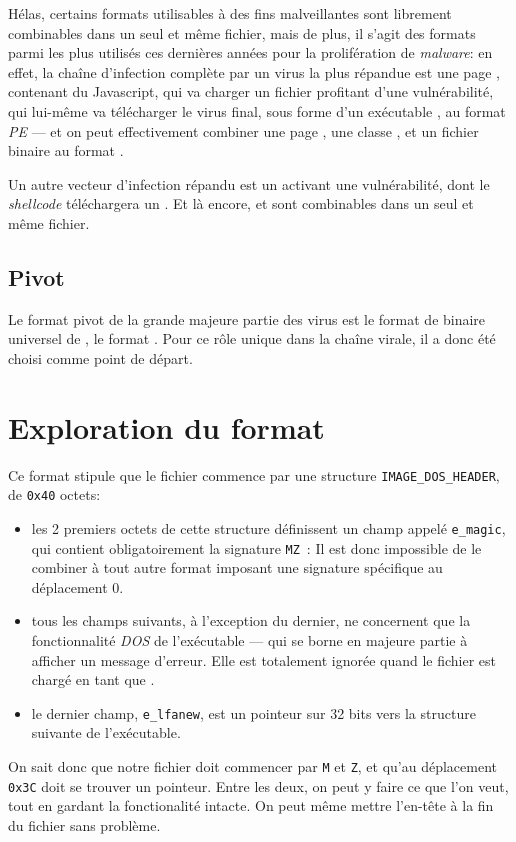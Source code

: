 Hélas, certains formats utilisables à des fins malveillantes sont librement combinables dans un seul et même fichier, mais de plus, il s'agit des formats parmi les plus utilisés ces dernières années pour la prolifération de {\it malware}:
en effet, la chaîne d'infection complète par un virus la plus répandue est une page \HTML, contenant du Javascript, qui va charger un fichier \JAVA profitant d'une vulnérabilité, qui lui-même va télécharger le virus final, sous forme d'un exécutable \WIN, au format \emph{PE} --- et on peut effectivement combiner une page \HTML, une classe \JAVA, et un fichier binaire au format \PE.

Un autre vecteur d'infection répandu est un \PDF activant une vulnérabilité, dont le \emph{shellcode} téléchargera un \PE. Et là encore, \PE et \PDF sont combinables dans un seul et même fichier.

\subsection{Pivot}

Le format pivot de la grande majeure partie des virus est le format de binaire universel de \WIN, le format \PE. Pour ce rôle unique dans la chaîne virale, il a donc été choisi comme point de départ.

\section{Exploration du format \PE}
Ce format stipule que le fichier commence par une structure \texttt{IMAGE\_DOS\_HEADER}, de \texttt{0x40} octets:
\begin{itemize}
\item les 2 premiers octets de cette structure définissent un champ appelé \texttt{e\_magic}, qui contient obligatoirement la signature \texttt{MZ}~: Il est donc impossible de le combiner à tout autre format imposant une signature spécifique au déplacement 0.
\item tous les champs suivants, à l'exception du dernier, ne concernent que la fonctionnalité \emph{DOS} de l'exécutable --- qui se borne en majeure partie à afficher un message d'erreur. Elle est totalement ignorée quand le fichier est chargé en tant que \PE.
\item le dernier champ, \texttt{e\_lfanew}, est un pointeur sur 32 bits vers la structure suivante de l'exécutable.
\end{itemize}

On sait donc que notre fichier doit commencer par {\tt M} et {\tt Z}, et qu'au déplacement \texttt{0x3C} doit se trouver un pointeur. Entre les deux, on peut y faire ce que l'on veut, tout en gardant la fonctionalité \PE intacte. On peut même mettre l'en-tête \PE à la fin du fichier sans problème.

